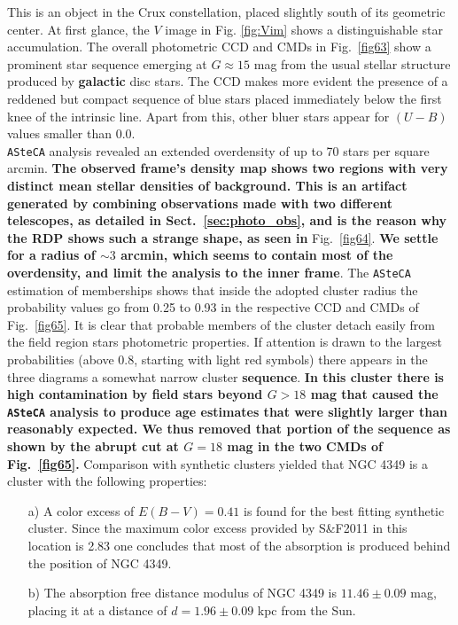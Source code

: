 \documentclass[referee]{aa}
\begin{document}
This is an object in the Crux constellation, placed slightly south of its
geometric center. At first glance, the $V$ image in Fig. \ref{fig:Vim} shows a
distinguishable star accumulation. The overall photometric CCD and CMDs in
Fig.~\ref{fig63} show a prominent star sequence emerging at $G\approx15$ mag
from the usual stellar structure produced by \textbf{galactic} disc stars.
The CCD makes more evident the presence of a reddened but compact sequence of
blue stars placed immediately below the first knee of the intrinsic line. Apart
from this, other bluer stars appear for $(U-B)$ values smaller than 0.0.\\ 

\texttt{ASteCA} analysis revealed an extended overdensity of up to 70 stars per
square arcmin. \textbf{The observed frame's density map shows two regions with
very distinct mean stellar densities of background.
This is an artifact generated by combining observations made with two different
telescopes, as detailed in Sect.~\ref{sec:photo_obs}, and is the reason why
the RDP shows such a strange shape, as seen in} Fig.~\ref{fig64}. \textbf{We
settle for a radius of $\sim3$ arcmin, which seems to contain most of the
overdensity, and limit the analysis to the inner frame}.
%
The \texttt{ASteCA} estimation of memberships shows that inside the adopted
cluster radius the probability values go from 0.25 to 0.93 in the respective
CCD and CMDs of Fig.~\ref{fig65}. It is clear that probable members of the
cluster detach easily from the field region stars photometric properties. If
attention is drawn to the largest probabilities (above 0.8, starting with
light red symbols) there appears in the three diagrams a somewhat narrow
cluster \textbf{sequence}.
%
\textbf{In this cluster there is high contamination by field stars beyond
$G>18$ mag that caused the \texttt{ASteCA} analysis to produce age estimates
that were slightly larger than reasonably expected. We thus removed that
portion of the sequence as shown by the abrupt cut at $G=18$ mag in the two
CMDs of Fig.~\ref{fig65}.}
%
Comparison with synthetic clusters yielded that NGC 4349 is a cluster with the
following properties:

\begin{itemize}
\item [a)] A color excess of $E(B-V)=0.41$ is found for the best
fitting synthetic cluster. Since the maximum color excess provided by
S\&F2011 in this location is 2.83 one concludes that most of the
absorption is produced behind the position of NGC 4349.
\item [b)] The absorption free distance modulus of NGC 4349 is
$11.46\pm0.09$ mag, placing it at a distance of $d=1.96\pm0.09$ kpc from
the Sun.
\end{itemize}
\end{document}
